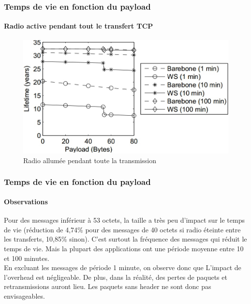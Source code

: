 \begin{frame}
 \frametitle{Temps de vie en fonction du payload}
 \framesubtitle{Radio active pendant tout le transfert TCP}
 \begin{figure}
  \centering
  \includegraphics[scale=\radiosca]{figures/radioon.jpg}
  \caption{Radio allumée pendant toute la transmission}
 \end{figure} 
\end{frame}

\begin{frame}
 \frametitle{Temps de vie en fonction du payload}
 \framesubtitle{Observations}
 Pour des messages inférieur à 53 octets, la taille a très peu d'impact sur le temps de vie
 (réduction de 4,74\% pour des messages de 40 octets si radio éteinte entre les transferts, 10,85\% sinon).
 C'est surtout la fréquence des messages qui réduit le temps de vie. Mais la plupart des applications ont une période moyenne entre 10 et 100 minutes.\\
 \vspace{5mm}
 En excluant les messages de période 1 minute, on observe donc que
 \alert{L'impact de l'overhead est négligeable}.
 \vspace{2mm}
 De plus, dans la réalité, des pertes de paquets et retransmissions auront lieu.
 \alert{Les paquets sans header ne sont donc pas envisageables}.
\end{frame}

